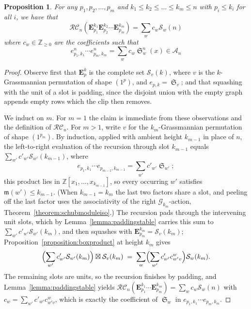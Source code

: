 \documentclass{amsart}
\newtheorem{proposition}[lemma]{Proposition}
\theoremstyle{definition}
\theoremstyle{remark}
\numberwithin{equation}{subsection}
\DeclareMathOperator{\sch}{\mathfrak{S}}
\newcommand{\grass}{\mathcal{G}}
\newcommand{\RC}{\mathcal{RC}}
\newcommand{\coma}{\mathcal{A}}
\newcommand{\maxd}{\mathfrak{m}}
\begin{document}
\begin{proposition} \label{proposition:eproductworks}
For any $p_1,p_2,\ldots,p_m$ and $k_1\leq k_2\leq\ldots\leq k_m\leq n$ with $p_i\leq k_i$ for all $i$, we have that
$$\RC_n(\mathbf{E}_{p_1}^{k_1}\mathbf{E}_{p_2}^{k_2}\cdots\mathbf{E}_{p_m}^{k_m}) = \sum_{w} c_w\mathcal{S}_w(n)$$
where $c_w\in \mathbb{Z}_{\geq 0}$ are the coefficients such that
$$e_{p_1,k_1}^n\cdots e_{p_m,k_m}^n = \sum_w c_w \sch_w^n(x)\in \coma_n$$
\end{proposition}
\begin{proof}
Observe first that $\mathbf{E}_{p}^{k}$ is the complete set $\mathcal{S}_{v}(k)$, where $v$ is the $k$-Grassmannian permutation of shape $(1^p)$, and $e_{p,k}=\sch_v$; and that squashing with the unit of a slot is padding, since the disjoint union with the empty graph appends empty rows which the clip then removes.

We induct on $m$. For $m=1$ the claim is immediate from these observations and the definition of $\RC_n$. For $m>1$, write $v$ for the $k_m$-Grassmannian permutation of shape $(1^{p_m})$. By induction, applied with ambient height $k_{m-1}$ in place of $n$, the left-to-right evaluation of the recursion through slot $k_{m-1}$ equals $\sum_{w'}c'_{w'}\mathcal{S}_{w'}(k_{m-1})$, where
$$e_{p_1,k_1}\cdots e_{p_{m-1},k_{m-1}} = \sum_{w'} c'_{w'}\sch_{w'};$$
this product lies in $\mathbb{Z}[x_1,\ldots,x_{k_{m-1}}]$, so every occurring $w'$ satisfies $\maxd(w')\leq k_{m-1}$. (When $k_{m-1}=k_m$ the last two factors share a slot, and peeling off the last factor uses the associativity of the right $\grass_{k_m}$-action, Theorem~\ref{theorem:schubmoduleiso}.) The recursion pads through the intervening unit slots, which by Lemma~\ref{lemma:paddingstable} carries this sum to $\sum_{w'}c'_{w'}\mathcal{S}_{w'}(k_m)$, and then squashes with $\mathbf{E}_{p_m}^{k_m}=\mathcal{S}_v(k_m)$; Proposition~\ref{proposition:boxproduct} at height $k_m$ gives
$$\Bigl(\sum_{w'}c'_{w'}\mathcal{S}_{w'}(k_m)\Bigr)\boxtimes\mathcal{S}_{v}(k_m)\;=\;\sum_{w}\Bigl(\sum_{w'}c'_{w'}c_{w'v}^{w}\Bigr)\mathcal{S}_{w}(k_m).$$
The remaining slots are units, so the recursion finishes by padding, and Lemma~\ref{lemma:paddingstable} yields $\RC_n(\mathbf{E}_{p_1}^{k_1}\cdots\mathbf{E}_{p_m}^{k_m})=\sum_w c_w\mathcal{S}_w(n)$ with $c_w=\sum_{w'}c'_{w'}c_{w'v}^{w}$, which is exactly the coefficient of $\sch_w$ in $e_{p_1,k_1}\cdots e_{p_m,k_m}$.
\end{proof}
\end{document}
